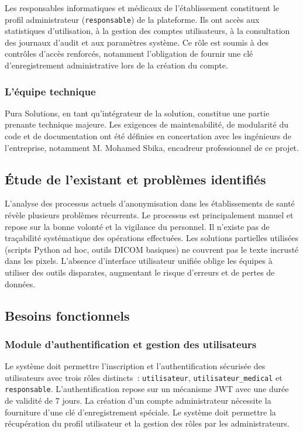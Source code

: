 Les responsables informatiques et médicaux de l'établissement constituent le profil administrateur (\texttt{responsable}) de la plateforme. Ils ont accès aux statistiques d'utilisation, à la gestion des comptes utilisateurs, à la consultation des journaux d'audit et aux paramètres système. Ce rôle est soumis à des contrôles d'accès renforcés, notamment l'obligation de fournir une clé d'enregistrement administrative lors de la création du compte.

\subsubsection{L'équipe technique}

Pura Solutions, en tant qu'intégrateur de la solution, constitue une partie prenante technique majeure. Les exigences de maintenabilité, de modularité du code et de documentation ont été définies en concertation avec les ingénieurs de l'entreprise, notamment M. Mohamed Sbika, encadreur professionnel de ce projet.

\subsection{Étude de l'existant et problèmes identifiés}

L'analyse des processus actuels d'anonymisation dans les établissements de santé révèle plusieurs problèmes récurrents. Le processus est principalement manuel et repose sur la bonne volonté et la vigilance du personnel. Il n'existe pas de traçabilité systématique des opérations effectuées. Les solutions partielles utilisées (scripts Python ad hoc, outils DICOM basiques) ne couvrent pas le texte incrusté dans les pixels. L'absence d'interface utilisateur unifiée oblige les équipes à utiliser des outils disparates, augmentant le risque d'erreurs et de pertes de données.

\subsection{Besoins fonctionnels}

\subsubsection{Module d'authentification et gestion des utilisateurs}

Le système doit permettre l'inscription et l'authentification sécurisée des utilisateurs avec trois rôles distincts~: \texttt{utilisateur}, \texttt{utilisateur\_medical} et \texttt{responsable}. L'authentification repose sur un mécanisme JWT avec une durée de validité de 7 jours. La création d'un compte administrateur nécessite la fourniture d'une clé d'enregistrement spéciale. Le système doit permettre la récupération du profil utilisateur et la gestion des rôles par les administrateurs.

